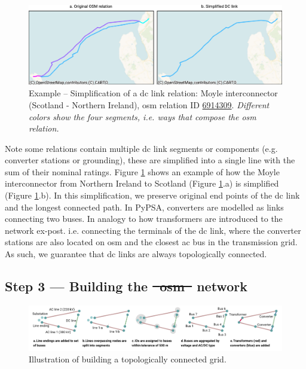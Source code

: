 \documentclass[fleqn,10pt]{wlscirep}
\providecommand{\DIFaddtex}[1]{{\protect\color{blue}\uwave{#1}}} %
\providecommand{\DIFdeltex}[1]{{\protect\color{red}\sout{#1}}}                      %
\providecommand{\DIFaddbegin}{} %
\providecommand{\DIFaddend}{} %
\providecommand{\DIFdelbegin}{} %
\providecommand{\DIFdelend}{} %
\providecommand{\DIFadd}[1]{\texorpdfstring{\DIFaddtex{#1}}{#1}} %
\providecommand{\DIFdel}[1]{\texorpdfstring{\DIFdeltex{#1}}{}} %
\begin{document}
\begin{figure}[!htbp]
    \centering
    \includegraphics{figures/fig_dc_example.pdf}
    \caption{Example -- Simplification of a \acrshort{dc} link relation: Moyle interconnector (Scotland - Northern Ireland), \acrshort{osm} relation ID \href{https://www.openstreetmap.org/relation/6914309}{6914309}. \textit{Different colors show the four segments, i.e. ways that compose the \acrshort{osm} relation.}}
    \label{fig:dc_example}
\end{figure}

Note \DIFaddbegin \DIFadd{that }\DIFaddend some relations contain multiple \acrshort{dc} link segments or components (e.g. converter stations or grounding), these are simplified into a single line with the sum of their nominal ratings. Figure \ref{fig:dc_example} shows an example of how the Moyle interconnector from Northern Ireland to Scotland (Figure \ref{fig:dc_example}.a) is simplified (Figure \ref{fig:dc_example}.b). In this simplification, we preserve original end points of the \acrshort{dc} link and the longest connected path. In PyPSA, converters are modelled as links connecting two buses. In analogy to how transformers are introduced to the network ex-post. i.e. connecting the terminals of the \acrshort{dc} link, where the converter stations are also located on \acrshort{osm} and the closest \acrshort{ac} bus in the transmission grid. As such, we guarantee that \acrshort{dc} links are always topologically connected.

\subsection*{Step 3 --- Building the \DIFdelbegin \DIFdel{\mbox{%
\gls{osm} }\hskip0pt%
}\DIFdelend \DIFaddbegin \DIFadd{OSM }\DIFaddend network}
\DIFaddbegin {}
\DIFaddend \begin{figure}[!htbp]
    \centering
    \includegraphics[width=\linewidth]{figures/fig_build_osm_network.pdf}
    \caption{Illustration of building a topologically connected grid.}
    \label{fig:build_osm_network}
\end{figure}
\end{document}
